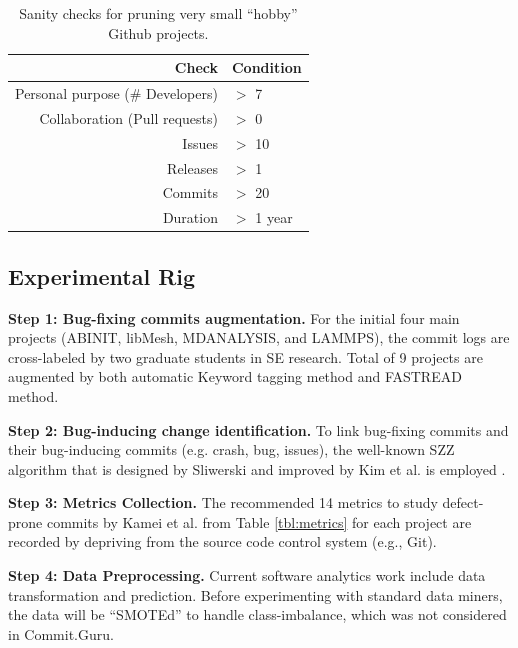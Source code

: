 \documentclass[sigconf,review, anonymous]{acmart}
\begin{document}
\begin{table}
\small
\caption{Sanity checks for pruning very small ``hobby'' Github projects.}\label{tbl:sanity}
\vspace{-10pt}
 \begin{tabular}{r|l}
Check   & Condition    \\\hline
Personal purpose (\# Developers) & $>$ 7 \\
Collaboration (Pull requests)  & $>$ 0 \\
Issues & $>$ 10 \\
Releases &  $>$ 1 \\
Commits & $>$ 20 \\
Duration  & $>$ 1 year 
\end{tabular}
\vspace{-17pt}
\end{table}




\subsection{Experimental Rig}

\noindent \textbf{Step 1: Bug-fixing commits augmentation.} For the initial four main projects (ABINIT, libMesh, MDANALYSIS, and LAMMPS), the commit logs are cross-labeled by two graduate students in SE research. Total of 9 projects are augmented by both automatic Keyword tagging method and FASTREAD method. 

\noindent \textbf{Step 2: Bug-inducing change identification.} To link bug-fixing commits and their bug-inducing commits (e.g. crash, bug, issues), the well-known SZZ algorithm that is designed by Sliwerski and improved by Kim et al. is employed \cite{Sliwerski05changes, Kim08changes}.  

\noindent \textbf{Step 3: Metrics Collection.} The recommended 14 metrics to study defect-prone commits by Kamei et al. \cite{kamei12_jit} from Table \ref{tbl:metrics} for each project are recorded by depriving from the source code control system (e.g., Git).  

\noindent \textbf{Step 4: Data Preprocessing.} Current software analytics work include data transformation and prediction. Before experimenting with standard data miners, the data will be ``SMOTEd'' to handle class-imbalance, which was not considered in Commit.Guru. 
\end{document}
